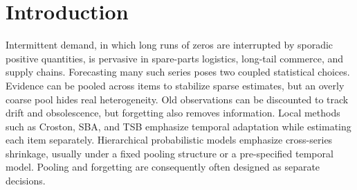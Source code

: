 \documentclass[twocolumn,10pt]{article}
\theoremstyle{definition}
\begin{document}
\begin{abstract}
Placing each panel on a controlled surface that varies leverage
and group separation together, the study assigns room to one panel:
Carparts, where a supplied true partition earns $1.7$ to $2.0\%$ and the
learned partition returns $-0.08\%$, a failure the same objective
reproduces at the same coordinates in simulation. On the other four the
surface predicts no room and none is found; across all five, refining the
pooling structure improves external accuracy on none. The diagnostic thus
separates panels without exploitable structure from the one panel where
the structure exists and current mixture objectives do not recover it. Two evaluation artifacts recur throughout: absolute-error
metrics reward the all-zero forecast on three panels, and the standard
split-conformal wrapper understates the conformal baseline by roughly
$20\%$ relative to its adaptive counterpart. The contribution is therefore
a cheap, deterministic predictive law together with an ex ante test of
whether cross-series pooling is worth attempting at all.
\end{abstract}


\section{Introduction}\label{sec:intro}

Intermittent demand, in which long runs of zeros are interrupted by
sporadic positive quantities, is pervasive in spare-parts logistics,
long-tail commerce, and supply chains. Forecasting many such series poses
two coupled statistical choices. Evidence can be pooled across items to
stabilize sparse estimates, but an overly coarse pool hides real
heterogeneity. Old observations can be discounted to track drift and
obsolescence, but forgetting also removes information. Local methods such
as Croston, SBA, and TSB
\citep{croston1972,syntetos2005accuracy,teunter2011} emphasize temporal
adaptation while estimating each item separately. Hierarchical
probabilistic models \citep{chapados2014,seeger2016,pitkin2024} emphasize
cross-series shrinkage, usually under a fixed pooling structure or a
pre-specified temporal model. Pooling and forgetting are consequently
often designed as separate decisions.
\end{document}
